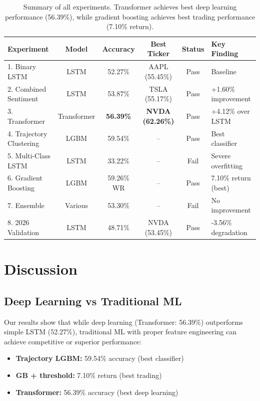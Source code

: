 \documentclass[10pt,twocolumn]{article}
\begin{document}
\begin{table}[t]
\centering
\small
\begin{tabular}{lccccl}
\toprule
Experiment & Model & Accuracy & Best Ticker & Status & Key Finding \\
\midrule
1. Binary LSTM & LSTM & 52.27\% & AAPL (55.45\%) & Pass & Baseline \\
2. Combined Sentiment & LSTM & 53.87\% & TSLA (55.17\%) & Pass & +1.60\% improvement \\
3. Transformer & Transformer & \textbf{56.39\%} & \textbf{NVDA (62.26\%)} & Pass & +4.12\% over LSTM \\
4. Trajectory Clustering & LGBM & 59.54\% & -- & Pass & Best classifier \\
5. Multi-Class LSTM & LSTM & 33.22\% & -- & Fail & Severe overfitting \\
6. Gradient Boosting & LGBM & 59.26\% WR & -- & Pass & 7.10\% return (best) \\
7. Ensemble & Various & 53.30\% & -- & Fail & No improvement \\
8. 2026 Validation & LSTM & 48.71\% & NVDA (53.45\%) & Pass & -3.56\% degradation \\
\bottomrule
\end{tabular}
\caption{Summary of all experiments. Transformer achieves best deep learning performance (56.39\%), while gradient boosting achieves best trading performance (7.10\% return).}
\end{table}

\section{Discussion}

\subsection{Deep Learning vs Traditional ML}

Our results show that while deep learning (Transformer: 56.39\%) outperforms simple LSTM (52.27\%), traditional ML with proper feature engineering can achieve competitive or superior performance:

\begin{itemize}
\item \textbf{Trajectory LGBM:} 59.54\% accuracy (best classifier)
\item \textbf{GB + threshold:} 7.10\% return (best trading)
\item \textbf{Transformer:} 56.39\% accuracy (best deep learning)
\end{itemize}
\end{document}
